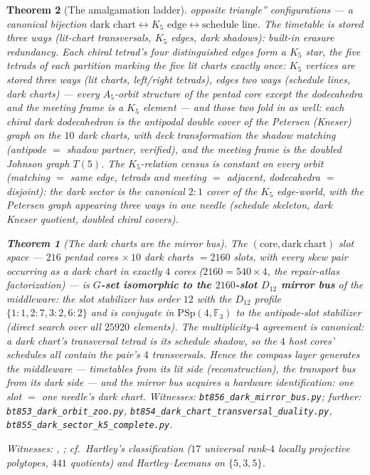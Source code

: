 \documentclass[11pt]{article}
\newtheorem{theorem}{Theorem}[section]
\newcommand{\GF}[1]{\mathbb{F}_{#1}}
\newcommand{\PSp}{\mathrm{PSp}}
\begin{document}
\begin{theorem}[The amalgamation ladder]
opposite triangle'' configurations --- a canonical bijection
$\text{dark chart}\leftrightarrow K_5\text{ edge}\leftrightarrow
\text{schedule line}$.  The timetable is stored three ways
(lit-chart transversals, $K_5$ edges, dark shadows): built-in
erasure redundancy.  Each chiral tetrad's four distinguished edges
form a $K_5$ \emph{star}, the five tetrads of each partition marking
the five lit charts exactly once: $K_5$ vertices are stored three
ways (lit charts, left/right tetrads), edges two ways (schedule
lines, dark charts) --- every $A_5$-orbit structure of the pentad
core except the dodecahedra and the meeting frame is a $K_5$
element --- and those two fold in as well: each chiral dark
dodecahedron is the \emph{antipodal double cover} of the Petersen
(Kneser) graph on the $10$ dark charts, with deck transformation the
shadow matching (antipode $=$ shadow partner, verified), and the
meeting frame is the doubled Johnson graph $T(5)$.  The
$K_5$-relation census is constant on every orbit (matching $=$ same
edge, tetrads and meeting $=$ adjacent, dodecahedra $=$ disjoint):
the dark sector is the canonical $2{:}1$ cover of the $K_5$
edge-world, with the Petersen graph appearing three ways in one
needle (schedule skeleton, dark Kneser quotient, doubled chiral
covers).

\begin{theorem}[The dark charts are the mirror bus]
The $(\mathrm{core},\mathrm{dark\ chart})$ slot space --- $216$
pentad cores $\times\,10$ dark charts $=2160$ slots, with every skew
pair occurring as a dark chart in exactly $4$ cores
($2160=540\times4$, the repair-atlas factorization) --- is
\textbf{$G$-set isomorphic to the $2160$-slot $D_{12}$ mirror bus}
of the middleware: the slot stabilizer has order $12$ with the
$D_{12}$ profile $\{1{:}1,2{:}7,3{:}2,6{:}2\}$ and is
\emph{conjugate in $\PSp(4,\GF3)$} to the antipode-slot stabilizer
(direct search over all $25920$ elements).  The multiplicity-$4$
agreement is canonical: a dark chart's transversal tetrad is its
schedule shadow, so the $4$ host cores' schedules all contain the
pair's $4$ transversals.  Hence the compass layer \emph{generates}
the middleware --- timetables from its lit side
(reconstruction), the transport bus from its dark side --- and the
mirror bus acquires a hardware identification: one slot $=$ one
needle's dark chart.
\emph{Witnesses: \texttt{bt856\_dark\_mirror\_bus.py}; further:
\texttt{bt853\_dark\_orbit\_zoo.py},
\texttt{bt854\_dark\_chart\_transversal\_duality.py},
\texttt{bt855\_dark\_sector\_k5\_complete.py}.}
\end{theorem}
\emph{Witnesses: ,
; cf.\ Hartley's classification ($17$
universal rank-$4$ locally projective polytopes, $441$ quotients) and
Hartley--Leemans on $\{5,3,5\}$.}
\end{theorem}
\end{document}
